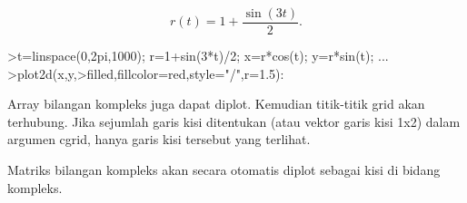 \documentclass{article}
\begin{document}
\begin{eulernotebook}
\begin{eulercomment}
\begin{eulercomment}
\begin{eulercomment}
\begin{eulercomment}
\begin{eulercomment}
\begin{eulercomment}
\begin{eulercomment}
\begin{eulercomment}
\begin{eulercomment}
\begin{eulercomment}
\begin{eulercomment}
\begin{eulercomment}
\begin{eulercomment}
\begin{eulercomment}
\begin{eulercomment}
\begin{eulercomment}
\begin{eulercomment}
\begin{eulercomment}
\begin{eulercomment}
\begin{eulercomment}
\begin{eulercomment}
\begin{eulercomment}
\begin{eulercomment}
\begin{eulercomment}
\begin{eulercomment}
\begin{eulercomment}
\begin{eulercomment}
\end{eulercomment}
\begin{eulerformula}
\[
r(t) = 1 + \dfrac{\sin(3t)}{2}.
\]
\end{eulerformula}
\begin{eulerprompt}
>t=linspace(0,2pi,1000); r=1+sin(3*t)/2; x=r*cos(t); y=r*sin(t); ...
>plot2d(x,y,>filled,fillcolor=red,style="/",r=1.5):
\end{eulerprompt}
\begin{eulercomment}
Array bilangan kompleks juga dapat diplot. Kemudian titik-titik grid
akan terhubung. Jika sejumlah garis kisi ditentukan (atau vektor garis
kisi 1x2) dalam argumen cgrid, hanya garis kisi tersebut yang
terlihat.

Matriks bilangan kompleks akan secara otomatis diplot sebagai kisi di
bidang kompleks.


\end{eulercomment}
\end{eulercomment}
\end{eulercomment}
\end{eulercomment}
\end{eulercomment}
\end{eulercomment}
\end{eulercomment}
\end{eulercomment}
\end{eulercomment}
\end{eulercomment}
\end{eulercomment}
\end{eulercomment}
\end{eulercomment}
\end{eulercomment}
\end{eulercomment}
\end{eulercomment}
\end{eulercomment}
\end{eulercomment}
\end{eulercomment}
\end{eulercomment}
\end{eulercomment}
\end{eulercomment}
\end{eulercomment}
\end{eulercomment}
\end{eulercomment}
\end{eulercomment}
\end{eulercomment}
\end{eulernotebook}
\end{document}
